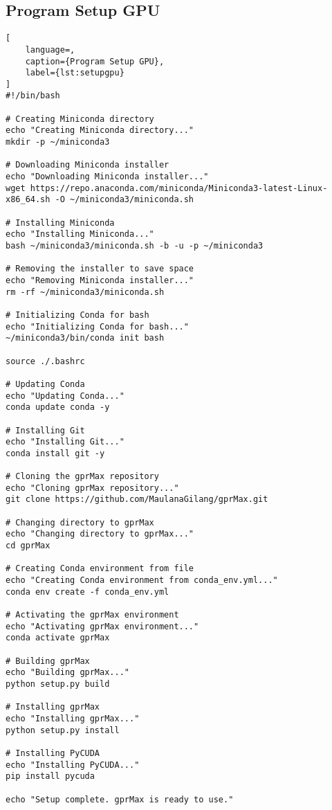\subsection*{Program Setup GPU}
\begin{lstlisting}[
    language=,
    caption={Program Setup GPU},
    label={lst:setupgpu}
]
#!/bin/bash

# Creating Miniconda directory
echo "Creating Miniconda directory..."
mkdir -p ~/miniconda3

# Downloading Miniconda installer
echo "Downloading Miniconda installer..."
wget https://repo.anaconda.com/miniconda/Miniconda3-latest-Linux-x86_64.sh -O ~/miniconda3/miniconda.sh

# Installing Miniconda
echo "Installing Miniconda..."
bash ~/miniconda3/miniconda.sh -b -u -p ~/miniconda3

# Removing the installer to save space
echo "Removing Miniconda installer..."
rm -rf ~/miniconda3/miniconda.sh

# Initializing Conda for bash
echo "Initializing Conda for bash..."
~/miniconda3/bin/conda init bash

source ./.bashrc

# Updating Conda
echo "Updating Conda..."
conda update conda -y

# Installing Git
echo "Installing Git..."
conda install git -y

# Cloning the gprMax repository
echo "Cloning gprMax repository..."
git clone https://github.com/MaulanaGilang/gprMax.git

# Changing directory to gprMax
echo "Changing directory to gprMax..."
cd gprMax

# Creating Conda environment from file
echo "Creating Conda environment from conda_env.yml..."
conda env create -f conda_env.yml

# Activating the gprMax environment
echo "Activating gprMax environment..."
conda activate gprMax

# Building gprMax
echo "Building gprMax..."
python setup.py build

# Installing gprMax
echo "Installing gprMax..."
python setup.py install

# Installing PyCUDA
echo "Installing PyCUDA..."
pip install pycuda

echo "Setup complete. gprMax is ready to use."
\end{lstlisting}

